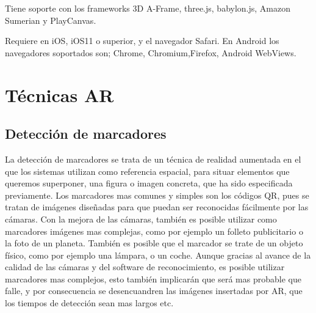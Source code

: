 Tiene soporte con los frameworks 3D A-Frame, three.js, babylon.js, Amazon Sumerian y PlayCanvas.

Requiere en iOS, iOS11 o superior, y el navegador Safari. En Android los navegadores soportados son; Chrome, Chromium,Firefox, Android WebViews.

\section{Técnicas AR}
	\subsection{Detección de marcadores}
	La detección de marcadores se trata de un técnica de realidad aumentada en el que los sistemas utilizan como referencia espacial, para situar elementos que queremos superponer, una figura o imagen concreta, que ha sido especificada previamente. Los marcadores mas comunes y simples son los códigos QR, pues se tratan de imágenes diseñadas para que puedan ser reconocidas fácilmente por las cámaras.
	Con la mejora de las cámaras, también es posible utilizar como marcadores imágenes mas complejas, como por ejemplo un folleto publicitario o la foto de un planeta.
	También es posible que el marcador se trate de un objeto físico, como por ejemplo una lámpara, o un coche.
	Aunque gracias al avance de la calidad de las cámaras y del software de reconocimiento, es posible utilizar marcadores mas complejos, esto también implicarán que será mas probable que falle, y por consecuencia se desencuandren las imágenes insertadas por AR, que los tiempos de detección sean mas largos etc.
	
